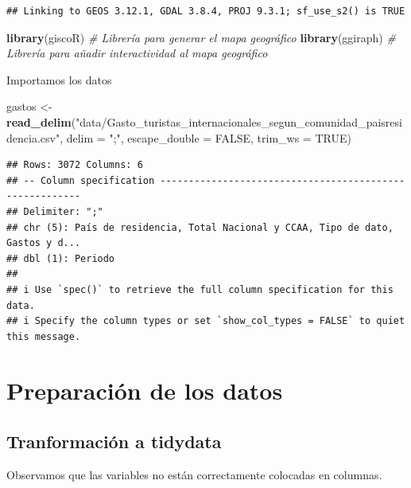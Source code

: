 \documentclass[data,article,submit,moreauthors,pdftex]{Definitions/mdpi}
\newenvironment{Shaded}{\begin{snugshade}}{\end{snugshade}}
\newcommand{\AttributeTok}[1]{\textcolor[rgb]{0.13,0.29,0.53}{#1}}
\newcommand{\CommentTok}[1]{\textcolor[rgb]{0.56,0.35,0.01}{\textit{#1}}}
\newcommand{\ConstantTok}[1]{\textcolor[rgb]{0.56,0.35,0.01}{#1}}
\newcommand{\FunctionTok}[1]{\textcolor[rgb]{0.13,0.29,0.53}{\textbf{#1}}}
\newcommand{\NormalTok}[1]{#1}
\newcommand{\OtherTok}[1]{\textcolor[rgb]{0.56,0.35,0.01}{#1}}
\newcommand{\StringTok}[1]{\textcolor[rgb]{0.31,0.60,0.02}{#1}}
\begin{document}
\begin{verbatim}
## Linking to GEOS 3.12.1, GDAL 3.8.4, PROJ 9.3.1; sf_use_s2() is TRUE
\end{verbatim}

\begin{Shaded}
\begin{Highlighting}[]
\FunctionTok{library}\NormalTok{(giscoR)  }\CommentTok{\# Librería para generar el mapa geográfico}
\FunctionTok{library}\NormalTok{(ggiraph)  }\CommentTok{\# Librería para añadir interactividad al mapa geográfico}
\end{Highlighting}
\end{Shaded}

Importamos los datos

\begin{Shaded}
\begin{Highlighting}[]
\NormalTok{gastos }\OtherTok{\textless{}{-}} \FunctionTok{read\_delim}\NormalTok{(}\StringTok{"data/Gasto\_turistas\_internacionales\_segun\_comunidad\_paisresidencia.csv"}\NormalTok{,}
    \AttributeTok{delim =} \StringTok{";"}\NormalTok{, }\AttributeTok{escape\_double =} \ConstantTok{FALSE}\NormalTok{, }\AttributeTok{trim\_ws =} \ConstantTok{TRUE}\NormalTok{)}
\end{Highlighting}
\end{Shaded}

\begin{verbatim}
## Rows: 3072 Columns: 6
## -- Column specification --------------------------------------------------------
## Delimiter: ";"
## chr (5): País de residencia, Total Nacional y CCAA, Tipo de dato, Gastos y d...
## dbl (1): Periodo
## 
## i Use `spec()` to retrieve the full column specification for this data.
## i Specify the column types or set `show_col_types = FALSE` to quiet this message.
\end{verbatim}

\section{Preparación de los datos}\label{preparaciuxf3n-de-los-datos}

\subsection{Tranformación a tidydata}\label{tranformaciuxf3n-a-tidydata}

Observamos que las variables no están correctamente colocadas en
columnas.
\end{document}
